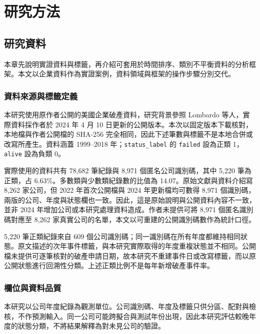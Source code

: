 \chapter{研究方法}\label{chap:method}
\begingroup
\setlength{\emergencystretch}{2em}

\section{研究資料}\label{sec:method-data}

本章先說明實證資料與標籤，再介紹可套用於時間排序、類別不平衡資料的分析框架。本文以企業資料作為實證案例，資料領域與框架的操作步驟分別交代。

\subsection{資料來源與標籤定義}

本研究使用原作者公開的美國企業破產資料，研究背景參照 Lombardo 等人\autocite{lombardo2022bankruptcy}，實際資料採作者於 2024 年 4 月 10 日更新的公開版本\autocite{sowide-bankruptcy-data}。本次以固定版本下載核對，本地檔與作者公開檔的 SHA-256 完全相同，因此下述筆數與標籤不是本地合併或改寫所產生。資料涵蓋 1999--2018 年；\nolinkurl{status_label} 的 \nolinkurl{failed} 設為正類 1，\nolinkurl{alive} 設為負類 0。

實際使用的資料共有 78,682 筆紀錄與 8,971 個匿名公司識別碼，其中 5,220 筆為正類，占 6.63\%。多數類與少數類紀錄數的比值為 14.07。原始文獻與資料介紹寫 8,262 家公司，但 2022 年首次公開檔與 2024 年更新檔均可數得 8,971 個識別碼，兩版的公司、年度與狀態欄也一致。因此，這是原始說明與公開資料內容不一致，並非 2024 年增加公司或本研究處理資料造成。作者未提供可將 8,971 個匿名識別碼對應至 8,262 家真實公司的名單，本文以可重建的公開識別碼數作為統計口徑。

5,220 筆正類紀錄來自 609 個公司識別碼；同一識別碼在所有年度都維持相同狀態。原文描述的次年事件標籤，與本研究實際取得的年度重複狀態並不相同。公開檔未提供可逐筆核對的破產申請日期，故本研究不重建事件日或改寫標籤，而以原公開狀態進行回溯性分類。上述正類比例不是每年新增破產事件率。

\subsection{欄位與資料品質}

本研究以公司年度紀錄為觀測單位。公司識別碼、年度及標籤只供分區、配對與檢核，不作預測輸入。同一公司可能跨擬合與測試年份出現，因此本研究評估較晚年度的狀態分類，不將結果解釋為對未見公司的驗證。

